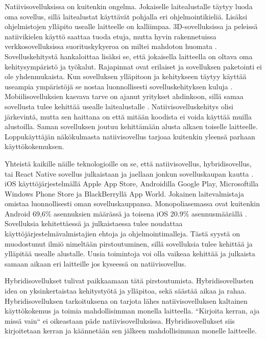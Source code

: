 \documentclass{tktltiki}
\begin{document}
Natiivisovelluksissa on kuitenkin ongelma. Jokaiselle laitealustalle täytyy luoda oma sovellus, sillä laitealustat käyttävät pohjalla eri ohjelmointikieliä. Lisäksi ohjelmistojen ylläpito usealle laitteelle on kalliimpaa. 3D-sovelluksissa ja peleissä natiivikielen käyttö saattaa tuoda etuja, mutta hyvin rakennetuissa verkkosovelluksissa suorituskykyeroa on miltei mahdoton huomata \cite{charland2011mobile}. Sovelluskehitystä hankaloittaa lisäksi se, että jokaisella laitteella on oltava oma kehitysympäristö ja työkalut. Rajapinnat ovat erilaiset ja sovelluksen paketointi ei ole yhdenmukaista. Kun sovelluksen ylläpitoon ja kehitykseen täytyy käyttää useampia ympäristöjä se nostaa luonnollisesti sovelluskehityksen kuluja \cite{xanthopoulos2013comparative}. Mobiilisovelluksien kasvava tarve on ajanut yritykset ahdinkoon, sillä samaa sovellusta tulee kehittää usealle laitealustalle \cite{xanthopoulos2013comparative}. Natiivisovelluskehitys olisi järkevintä, mutta sen haittana on että mitään koodista ei voida käyttää muilla alustoilla. Saman sovelluksen joutuu kehittämään alusta alkaen toiselle laitteelle. Loppukäyttäjän näkökulmasta natiivisovellus tarjoaa kuitenkin yleensä parhaan käyttökokemuksen.

Yhteistä kaikille näille teknologioille on se, että natiivisovellus, hybridisovellus, tai React Native sovellus julkaistaan ja jaellaan jonkun sovelluskaupan kautta \cite{xanthopoulos2013comparative}. iOS käyttöjärjestelmällä Apple App Store, Androidilla Google Play, Microsoftilla Windows Phone Store ja BlackBerryllä App World. Jokainen laitevalmistaja omistaa luonnollisesti oman sovelluskauppansa. Monopoliasemassa ovat kuitenkin Android 69,6\% asennuksien määrässä ja toisena iOS 20.9\% asennusmäärällä \cite{xanthopoulos2013comparative}. Sovelluksia kehitettäessä ja julkaistaessa tulee noudattaa käyttöjärjestelmävalmistajien ehtoja ja ohjelmointimalleja. Tästä syystä on muodostunut ilmiö nimeltään pirstoutuminen, sillä sovelluksia tulee kehittää ja ylläpitää usealle alustalle. Uusia toimintoja voi olla vaikeaa kehittää ja julkaista samaan aikaan eri laitteille jos kyseessä on natiivisovellus.

Hybridisovellukset tulivat paikkaamaan tätä pirstoutumista. Hybridisovellusten idea on yksinkertaistaa kehitystyötä ja ylläpitoa, sekä säästää aikaa ja rahaa.  Hybridisovelluksen tarkoituksena on tarjota lähes natiivisovelluksen kaltainen käyttökokemus ja toimia mahdollisimman monella laitteella. “Kirjoita kerran, aja missä vain“ ei oikeastaan päde natiivisovelluksissa. Hybridisovellukset siis kirjoitetaan kerran ja käännetään sen jälkeen mahdollisimman monelle laitteelle. 
\end{document}
